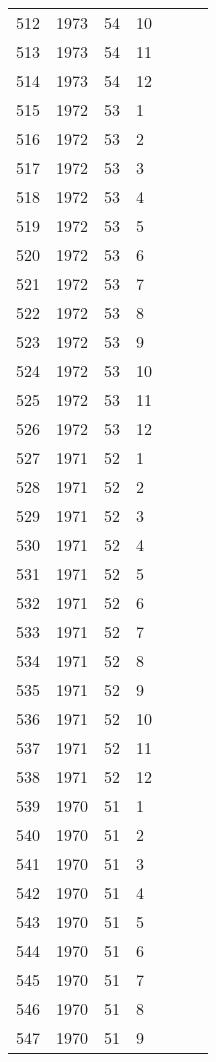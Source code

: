\begin{longtable}{ |l|l|l|l|l|l|l| }
512 & 1973 & 54 & 10 &  &  &  \\
513 & 1973 & 54 & 11 &  &  &  \\
514 & 1973 & 54 & 12 &  &  &  \\
515 & 1972 & 53 & 1 &  &  &  \\
516 & 1972 & 53 & 2 &  &  &  \\
517 & 1972 & 53 & 3 &  &  &  \\
518 & 1972 & 53 & 4 &  &  &  \\
519 & 1972 & 53 & 5 &  &  &  \\
520 & 1972 & 53 & 6 &  &  &  \\
521 & 1972 & 53 & 7 &  &  &  \\
522 & 1972 & 53 & 8 &  &  &  \\
523 & 1972 & 53 & 9 &  &  &  \\
524 & 1972 & 53 & 10 &  &  &  \\
525 & 1972 & 53 & 11 &  &  &  \\
526 & 1972 & 53 & 12 &  &  &  \\
527 & 1971 & 52 & 1 &  &  &  \\
528 & 1971 & 52 & 2 &  &  &  \\
529 & 1971 & 52 & 3 &  &  &  \\
530 & 1971 & 52 & 4 &  &  &  \\
531 & 1971 & 52 & 5 &  &  &  \\
532 & 1971 & 52 & 6 &  &  &  \\
533 & 1971 & 52 & 7 &  &  &  \\
534 & 1971 & 52 & 8 &  &  &  \\
535 & 1971 & 52 & 9 &  &  &  \\
536 & 1971 & 52 & 10 &  &  &  \\
537 & 1971 & 52 & 11 &  &  &  \\
538 & 1971 & 52 & 12 &  &  &  \\
539 & 1970 & 51 & 1 &  &  &  \\
540 & 1970 & 51 & 2 &  &  &  \\
541 & 1970 & 51 & 3 &  &  &  \\
542 & 1970 & 51 & 4 &  &  &  \\
543 & 1970 & 51 & 5 &  &  &  \\
544 & 1970 & 51 & 6 &  &  &  \\
545 & 1970 & 51 & 7 &  &  &  \\
546 & 1970 & 51 & 8 &  &  &  \\
547 & 1970 & 51 & 9 &  &  &  \\

\end{longtable}
